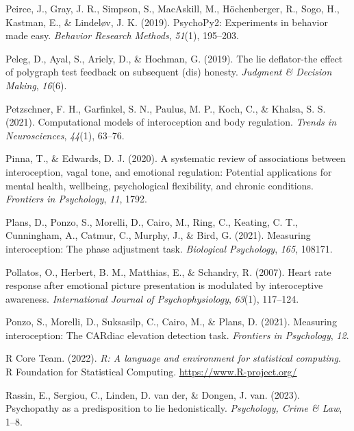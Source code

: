 \documentclass[
  man,mask,floatsintext]{apa6}
\newlength{\cslhangindent}
\newlength{\cslentryspacingunit} %
\newenvironment{CSLReferences}[2] %
 {%
  \setlength{\parindent}{0pt}
  \ifodd #1
  \let\oldpar\par
  \def\par{\hangindent=\cslhangindent\oldpar}
  \fi
  \setlength{\parskip}{#2\cslentryspacingunit}
 }%
 {}
\begin{document}
\begin{CSLReferences}{1}{0}
\leavevmode{}%
Peirce, J., Gray, J. R., Simpson, S., MacAskill, M., Höchenberger, R., Sogo, H., Kastman, E., \& Lindeløv, J. K. (2019). PsychoPy2: Experiments in behavior made easy. \emph{Behavior Research Methods}, \emph{51}(1), 195--203.

\leavevmode{}%
Peleg, D., Ayal, S., Ariely, D., \& Hochman, G. (2019). The lie deflator-the effect of polygraph test feedback on subsequent (dis) honesty. \emph{Judgment \& Decision Making}, \emph{16}(6).

\leavevmode{}%
Petzschner, F. H., Garfinkel, S. N., Paulus, M. P., Koch, C., \& Khalsa, S. S. (2021). Computational models of interoception and body regulation. \emph{Trends in Neurosciences}, \emph{44}(1), 63--76.

\leavevmode{}%
Pinna, T., \& Edwards, D. J. (2020). A systematic review of associations between interoception, vagal tone, and emotional regulation: Potential applications for mental health, wellbeing, psychological flexibility, and chronic conditions. \emph{Frontiers in Psychology}, \emph{11}, 1792.

\leavevmode{}%
Plans, D., Ponzo, S., Morelli, D., Cairo, M., Ring, C., Keating, C. T., Cunningham, A., Catmur, C., Murphy, J., \& Bird, G. (2021). Measuring interoception: The phase adjustment task. \emph{Biological Psychology}, \emph{165}, 108171.

\leavevmode{}%
Pollatos, O., Herbert, B. M., Matthias, E., \& Schandry, R. (2007). Heart rate response after emotional picture presentation is modulated by interoceptive awareness. \emph{International Journal of Psychophysiology}, \emph{63}(1), 117--124.

\leavevmode{}%
Ponzo, S., Morelli, D., Suksasilp, C., Cairo, M., \& Plans, D. (2021). Measuring interoception: The CARdiac elevation detection task. \emph{Frontiers in Psychology}, \emph{12}.

\leavevmode{}%
R Core Team. (2022). \emph{R: A language and environment for statistical computing}. R Foundation for Statistical Computing. \url{https://www.R-project.org/}

\leavevmode{}%
Rassin, E., Sergiou, C., Linden, D. van der, \& Dongen, J. van. (2023). Psychopathy as a predisposition to lie hedonistically. \emph{Psychology, Crime \& Law}, 1--8.


\end{CSLReferences}
\end{document}

